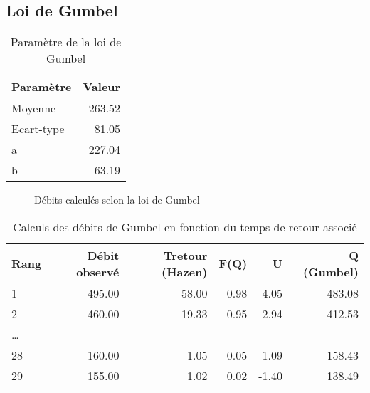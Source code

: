 \subsection{Loi de Gumbel}
\begin{table}[H]
    \centering
    \begin{tabular}{l|r}
        \toprule
        \textbf{Paramètre} & \textbf{Valeur} \\
        \midrule
        Moyenne            & 263.52          \\
        Ecart-type         & 81.05           \\
        a                  & 227.04          \\
        b                  & 63.19           \\
        \bottomrule
    \end{tabular}
    \caption{Paramètre de la loi de Gumbel}
    \label{tab:param_Gumbel}
\end{table}

\begin{figure}[H]
    \centering
    \caption{Débits calculés selon la loi de Gumbel}
    \label{graph:debits_gumbel}
\end{figure}

\begin{table}[H]
    \centering
    \begin{tabular}{l|r|r|r|r|r}
        \toprule
        \textbf{Rang} & \textbf{Débit observé} & \textbf{Tretour (Hazen)} & \textbf{F(Q)} & \textbf{U} & \textbf{Q (Gumbel)} \\
        \midrule
        1             & 495.00                 & 58.00                    & 0.98          & 4.05       & 483.08              \\
        2             & 460.00                 & 19.33                    & 0.95          & 2.94       & 412.53              \\
        \dots         &                        &                          &               &            &                     \\
        28            & 160.00                 & 1.05                     & 0.05          & -1.09      & 158.43              \\
        29            & 155.00                 & 1.02                     & 0.02          & -1.40      & 138.49              \\
        \bottomrule
    \end{tabular}
    \caption{Calculs des débits de Gumbel en fonction du temps de retour associé}
    \label{tab:gumbelcalcul}
\end{table}

